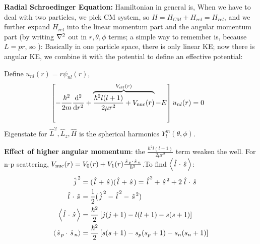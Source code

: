 \documentclass{school-22.101-notes}
\begin{document}
\clearpage
{}
\textbf{Radial Schroedinger Equation:} Hamiltonian in general is, 
When we have to deal with two particles, we pick CM system, so $H = H_{CM} + H_{rel} = H_{rel}$, and we further expand $H_{rel}$ into the linear momentum part and the angular momentum part (by writing $\nabla^2$ out in $r,\theta, \phi$ terms; a simple way to remember is, because $L = p r$, so ): 
Basically in one particle space, there is only linear KE; now there is angular KE, we combine it with the potential to define an effective potential: 

Define $u_{nl} (r) = r \psi_{nl} (r)$,
\begin{align}
\left[ - \frac{\hbar^2}{2m} \frac{\mathrm{d}^{2}}{\mathrm{d}r^{2}} + \overbrace{\frac{\hbar^2 l (l+1)}{2 \mu r^2} + V_{\mathrm{nuc}} (r) }^{V_{\mathrm{eff}} (r)} - E \right] u_{nl} (r) &= 0 
\end{align}
Eigenstate for $\hat{L}^2, \hat{L}_z, \hat{H}$ is the spherical harmonics $Y_l^m (\theta, \phi)$. 


\textbf{Effect of higher angular momentum}: the $\frac{\hbar^2 l(l+1)}{2 \mu r^2}$ term weaken the well. For n-p scattering, $V_{\mathrm{nuc}} (r) = V_0 (r) + V_1 (r) \frac{\left. \hat{s} \right._p \cdot \left. \hat{s} \right._n}{\hbar^2}$.To find $\left< \left. \hat{l} \right. \cdot \left. \hat{s} \right. \right>$: 
\begin{align}
\left. \hat{j} \right.^2 &= (\left. \hat{l} \right. + \left. \hat{s} \right.)(\left. \hat{l} \right. + \left. \hat{s} \right.) = \left. \hat{l} \right.^2 + \left. \hat{s} \right.^2 + 2 \left. \hat{l} \right. \cdot \left. \hat{s} \right. \\ 
\left. \hat{l} \right. \cdot \left. \hat{s} \right. &= \frac{1}{2} (\left. \hat{j} \right.^2 - \left. \hat{l} \right.^2 - \left. \hat{s} \right.^2 ) \\
\left<  \left. \hat{l} \right. \cdot \left. \hat{s} \right. \right> &= \frac{\hbar^2}{2} \left[ j(j+1) - l(l+1) - s(s+1) \right] \\
\left<  \left. \hat{s} \right._p \cdot \left. \hat{s} \right._n \right> &= \frac{\hbar^2}{2} \left[ s(s+1) - s_p(s_p+1) - s_n(s_n+1) \right] 
\end{align}
\end{document}
